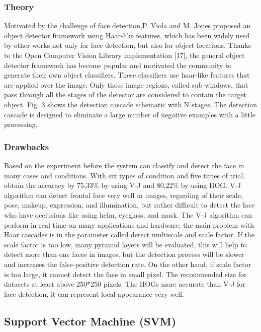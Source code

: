 \documentclass[14.49pt, a4paper, one side, margin = 2in]{article}
\begin{document}
\subsubsection{Theory}
Motivated by the challenge of face detection,P. Viola and M. Jones proposed
an object detector framework using Haar-like features, which
has been widely used by other works not only for face
detection, but also for object locations.
Thanks to the Open Computer Vision Library
implementation [17], the general object detector framework
has become popular and motivated the community to generate
their own object classifiers. These classifiers use haar-like
features that are applied over the image. Only those image
regions, called sub-windows, that pass through all the stages of
the detector are considered to contain the target object. Fig. 3
shows the detection cascade schematic with N stages. The
detection cascade is designed to eliminate a large number of
negative examples with a little processing.\cite{padilla2012evaluation}
\subsubsection{Drawbacks}
Based on the experiment before the system can classify and detect the face in many cases and conditions.
With six types of condition and five times of trial, obtain the accuracy by 75,33\% by using V-J and
80,22\% by using HOG. V-J algorithm can detect frontal face very well in images, regarding of their
scale, pose, makeup, expression, and illumination, but rather difficult to detect the face who have
occlusions like using helm, eyeglass, and mask. The V-J algorithm can perform in real-time on many
applications and hardware, the main problem with Haar cascades is in the parameter called detect
multiscale and scale factor. If the scale factor is too low, many pyramid layers will be evaluated, this
will help to detect more than one faces in images, but the detection process will be slower and increases
the false-positive detection rate. On the other hand, if scale factor is too large, it cannot detect the face
in small pixel. The recommended size for datasets at least above 250*250 pixels. The HOGs more
accurate than V-J for face detection, it can represent local appearance very well\cite{rahmad2020comparison}.
\subsection{Support Vector Machine (SVM)}
\end{document}
